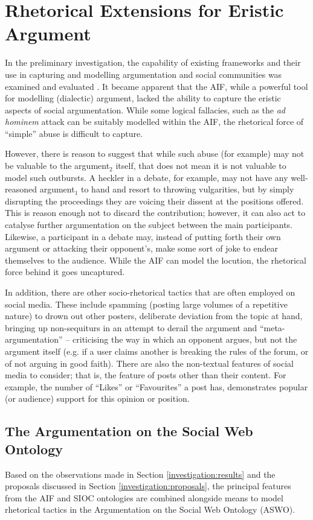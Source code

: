 \chapter{Rhetorical Extensions for Eristic Argument}
\label{aswo}
In the preliminary investigation, the capability of existing frameworks and their use in capturing and modelling argumentation and social communities was examined and evaluated \citep{Blount2014}. It became apparent that the AIF, while a powerful tool for modelling (dialectic) argument, lacked the ability to capture the eristic aspects of social argumentation. While some logical fallacies, such as the \textit{ad hominem} attack can be suitably modelled within the AIF, the rhetorical force of ``simple'' abuse is difficult to capture. 

However, there is reason to suggest that while such abuse (for example) may not be valuable to the argument$_2$ itself, that does not mean it is not valuable to model such outbursts. A heckler in a debate, for example, may not have any well-reasoned argument$_1$ to hand and resort to throwing vulgarities, but by simply disrupting the proceedings they are voicing their dissent at the positions offered. This is reason enough not to discard the contribution; however, it can also act to catalyse further argumentation on the subject between the main participants. Likewise, a participant in a debate may, instead of putting forth their own argument or attacking their opponent's, make some sort of joke to endear themselves to the audience. While the AIF can model the locution, the rhetorical force behind it goes uncaptured.

In addition, there are other socio-rhetorical tactics that are often employed on social media. These include spamming (posting large volumes of a repetitive nature) to drown out other posters, deliberate deviation from the topic at hand, bringing up non-sequiturs in an attempt to derail the argument and ``meta-argumentation'' -- criticising the way in which an opponent argues, but not the argument itself (e.g. if a user claims another is breaking the rules of the forum, or of not arguing in good faith). There are also the non-textual features of social media to consider; that is, the feature of posts other than their content. For example, the number of ``Likes'' or ``Favourites'' a post has, demonstrates popular (or audience) support for this opinion or position. 


\section{The Argumentation on the Social Web Ontology}
\label{aswo:augmentations}
Based on the observations made in Section \ref{investigation:results} and the proposals discussed in Section \ref{investigation:proposals}, the principal features from the AIF and SIOC ontologies are combined alongside means to model rhetorical tactics in the Argumentation on the Social Web Ontology (ASWO).

